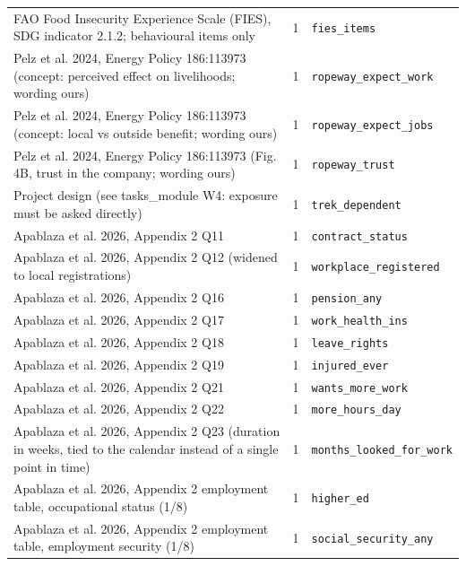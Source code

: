 \documentclass[9pt,a4paper,landscape]{article}
\begin{document}
\begin{longtable}{@{}p{9.5cm}p{1.2cm}p{12.5cm}@{}}
\scriptsize FAO Food Insecurity Experience Scale (FIES), SDG indicator 2.1.2; behavioural items only & \scriptsize 1 & \scriptsize\texttt{fies\_items}\\
\scriptsize Pelz et al. 2024, Energy Policy 186:113973 (concept: perceived effect on livelihoods; wording ours) & \scriptsize 1 & \scriptsize\texttt{ropeway\_expect\_work}\\
\scriptsize Pelz et al. 2024, Energy Policy 186:113973 (concept: local vs outside benefit; wording ours) & \scriptsize 1 & \scriptsize\texttt{ropeway\_expect\_jobs}\\
\scriptsize Pelz et al. 2024, Energy Policy 186:113973 (Fig. 4B, trust in the company; wording ours) & \scriptsize 1 & \scriptsize\texttt{ropeway\_trust}\\
\scriptsize Project design (see tasks\_module W4: exposure must be asked directly) & \scriptsize 1 & \scriptsize\texttt{trek\_dependent}\\
\scriptsize Apablaza et al. 2026, Appendix 2 Q11 & \scriptsize 1 & \scriptsize\texttt{contract\_status}\\
\scriptsize Apablaza et al. 2026, Appendix 2 Q12 (widened to local registrations) & \scriptsize 1 & \scriptsize\texttt{workplace\_registered}\\
\scriptsize Apablaza et al. 2026, Appendix 2 Q16 & \scriptsize 1 & \scriptsize\texttt{pension\_any}\\
\scriptsize Apablaza et al. 2026, Appendix 2 Q17 & \scriptsize 1 & \scriptsize\texttt{work\_health\_ins}\\
\scriptsize Apablaza et al. 2026, Appendix 2 Q18 & \scriptsize 1 & \scriptsize\texttt{leave\_rights}\\
\scriptsize Apablaza et al. 2026, Appendix 2 Q19 & \scriptsize 1 & \scriptsize\texttt{injured\_ever}\\
\scriptsize Apablaza et al. 2026, Appendix 2 Q21 & \scriptsize 1 & \scriptsize\texttt{wants\_more\_work}\\
\scriptsize Apablaza et al. 2026, Appendix 2 Q22 & \scriptsize 1 & \scriptsize\texttt{more\_hours\_day}\\
\scriptsize Apablaza et al. 2026, Appendix 2 Q23 (duration in weeks, tied to the calendar instead of a single point in time) & \scriptsize 1 & \scriptsize\texttt{months\_looked\_for\_work}\\
\scriptsize Apablaza et al. 2026, Appendix 2 employment table, occupational status (1/8) & \scriptsize 1 & \scriptsize\texttt{higher\_ed}\\
\scriptsize Apablaza et al. 2026, Appendix 2 employment table, employment security (1/8) & \scriptsize 1 & \scriptsize\texttt{social\_security\_any}\\

\end{longtable}
\end{document}
